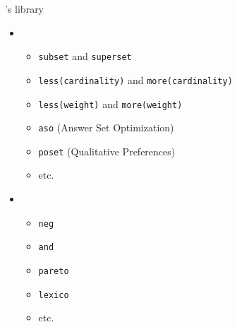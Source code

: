\begin{frame}{\asprin's library}
  \begin{itemize}
  \item<1-> 
    \begin{itemize}
    \item \texttt{subset} and \texttt{superset}
    \item \texttt{less(cardinality)} and \texttt{more(cardinality)}
    \item \texttt{less(weight)} and \texttt{more(weight)}
    \item \texttt{aso}   (Answer Set Optimization) \nocite{brnitr03a}
    \item \texttt{poset} (Qualitative Preferences) \nocite{rogima10a}
    \item etc.
    \end{itemize}
    \smallskip
  \item<1->  \nocite{sonpon06a}
    \begin{itemize}
    \item \texttt{neg}
    \item \texttt{and}
    \item \texttt{pareto}
    \item \texttt{lexico}
    \item etc.
    \end{itemize}
  \end{itemize}
\end{frame}
%
